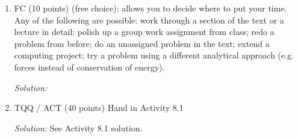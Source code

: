 \documentclass[12pt]{article}
\newcommand{\soln}[2] {\textit{Solution:} #2}
\begin{document}
\begin{enumerate}
\begin{enumerate}
{                              If $\phi$ is constant, the $r$ equation becomes $\mu\ddot r = -k(r - L)$, which we've seen before -- the solution can be written as $r(t) = L + A \cos(\omega t - \delta)$, that is, the masses oscillate about the spring's equilibrium position.
                        }

            \end{enumerate}

            \clearpage
      \item	FC (10 points) (free choice): allows you to decide where to put your time.  Any of the following are possible: work through a section of the text or a lecture in detail; polish up a group work assignment from class; redo a problem from before; do an unassigned problem in the text; extend a computing project; try a problem using a different analytical approach (e.g. forces instead of conservation of energy).

            \soln{40em}
            {}


      \item TQQ / ACT (40 points) Hand in Activity 8.1

            \soln{1em}{See Activity 8.1 solution.}



\end{enumerate}
\end{document}
